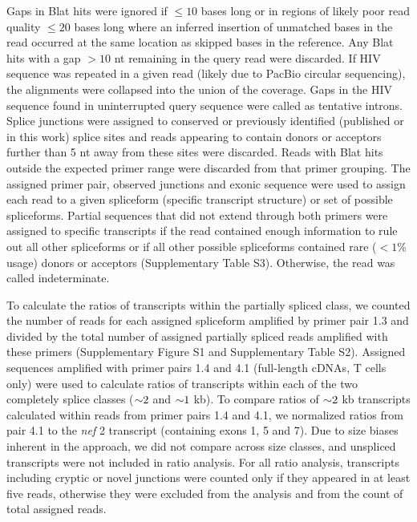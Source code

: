 \documentclass[../sherrill-Mix_thesis.tex]{subfiles}
\begin{document}
Gaps in Blat hits were ignored if $\le 10$ bases long or in regions of likely poor read quality $\le 20$ bases long where an inferred insertion of unmatched bases in the read occurred at the same location as skipped bases in the reference. Any Blat hits with a gap $>10$ nt remaining in the query read were discarded. If HIV sequence was repeated in a given read (likely due to PacBio circular sequencing), the alignments were collapsed into the union of the coverage. Gaps in the HIV sequence found in uninterrupted query sequence were called as tentative introns. Splice junctions were assigned to conserved or previously identified (published or in this work) splice sites and reads appearing to contain donors or acceptors further than 5 nt away from these sites were discarded. Reads with Blat hits outside the expected primer range were discarded from that primer grouping. The assigned primer pair, observed junctions and exonic sequence were used to assign each read to a given spliceform (specific transcript structure) or set of possible spliceforms. Partial sequences that did not extend through both primers were assigned to specific transcripts if the read contained enough information to rule out all other spliceforms or if all other possible spliceforms contained rare ($<1$\% usage) donors or acceptors (Supplementary Table S3). Otherwise, the read was called indeterminate.

To calculate the ratios of transcripts within the partially spliced class, we counted the number of reads for each assigned spliceform amplified by primer pair 1.3 and divided by the total number of assigned partially spliced reads amplified with these primers (Supplementary Figure S1 and Supplementary Table S2). Assigned sequences amplified with primer pairs 1.4 and 4.1 (full-length cDNAs, T cells only) were used to calculate ratios of transcripts within each of the two completely splice classes ($\mathord{\sim}{}2$ and $\mathord{\sim}{}1$ kb). To compare ratios of $\mathord{\sim}{}2$ kb transcripts calculated within reads from primer pairs 1.4 and 4.1, we normalized ratios from pair 4.1 to the \textit{nef} 2 transcript (containing exons 1, 5 and 7). Due to size biases inherent in the approach, we did not compare across size classes, and unspliced transcripts were not included in ratio analysis. For all ratio analysis, transcripts including cryptic or novel junctions were counted only if they appeared in at least five reads, otherwise they were excluded from the analysis and from the count of total assigned reads.
\end{document}
